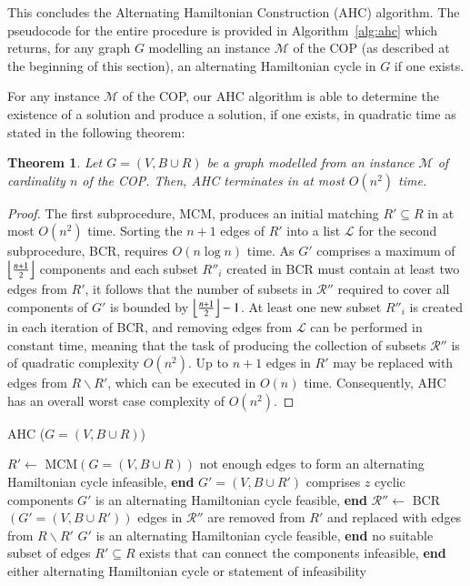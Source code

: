 \documentclass[a4paper,11pt,authoryear]{elsarticle}
\newcommand{\rev}[1]{{\color{myRed}#1}}
\DeclarePairedDelimiter{\floor}{\lfloor}{\rfloor}
\newtheorem{theorem}{Theorem}
\begin{document}
\rev{This concludes the Alternating Hamiltonian Construction (AHC) algorithm. The pseudocode for the entire procedure is provided in Algorithm~\ref{alg:ahc} which returns, for any graph $G$ modelling an instance $\mathcal{M}$ of the COP (as described at the beginning of this section), an alternating Hamiltonian cycle in $G$ if one exists.}

\rev{For any instance $\mathcal{M}$ of the COP, our AHC algorithm is able to determine the existence of a solution and produce a solution, if one exists, in quadratic time as stated in the following theorem:}

\begin{theorem}
	Let $G=(V, B \cup R)$ be a graph modelled from an instance $\mathcal{M}$ of cardinality $n$ of the COP. Then, AHC terminates in at most $O(n^2)$ time.
	\label{thm:ahc}
\end{theorem}

\begin{proof}
	The first subprocedure, MCM, produces an initial matching $R' \subseteq R$ in at most $O(n^2)$ time. Sorting the $n+1$ edges of $R'$ into a list $\mathcal{L}$ for the second subprocedure, BCR, requires $O(n\log n)$ time. As $G'$ comprises a maximum of $\floor*{\frac{n+1}{2}}$ components and each subset $R''_i$ created in BCR must contain at least two edges from $R'$, it follows that the number of subsets in $\mathcal{R}''$ required to cover all components of $G'$ is bounded by $\floor*{\frac{n+1}{2}}-1$. At least one new subset $R''_i$ is created in each iteration of BCR, and removing edges from $\mathcal{L}$ can be performed in constant time, meaning that the task of producing the collection of subsets $\mathcal{R}''$ is of quadratic complexity $O(n^2)$. Up to $n+1$ edges in $R'$ may be replaced with edges from $R \backslash R'$, which can be executed in $O(n)$ time. Consequently, AHC has an overall worst case complexity of $O(n^2)$. 
\end{proof}	

\begin{algorithm}[h]
\caption{\rev{AHC ($G = (V, B \cup R)$)}}
\small
\rev{
\begin{algorithmic}[1]
	\State $R' \gets$ MCM$(G = (V, B \cup R))$
	\If{$|R'| < n+1$}
		\State not enough edges to form an alternating Hamiltonian cycle
		\State infeasible, \textbf{end}
	\EndIf
	\State $G'=(V, B \cup R')$ comprises $z$ cyclic components
	\If{$z=1$}
		\State $G'$ is an alternating Hamiltonian cycle
		\State feasible, \textbf{end}
	\EndIf
	\State $\mathcal{R}'' \gets$ BCR$(G'=(V, B \cup R'))$
	\If{$\mathcal{R}''$ covers all $z$ components of $G'$}
		\State edges in $\mathcal{R}''$ are removed from $R'$ and replaced with edges from $R\backslash R'$
		\State $G'$ is an alternating Hamiltonian cycle
		\State feasible, \textbf{end}
	\Else
		\State no suitable subset of edges $R' \subseteq R$ exists that can connect the components
		\State infeasible, \textbf{end}
	\EndIf
	\Return either alternating Hamiltonian cycle or statement of infeasibility
\end{algorithmic}
}
\label{alg:ahc}	
\end{algorithm}
\end{document}
